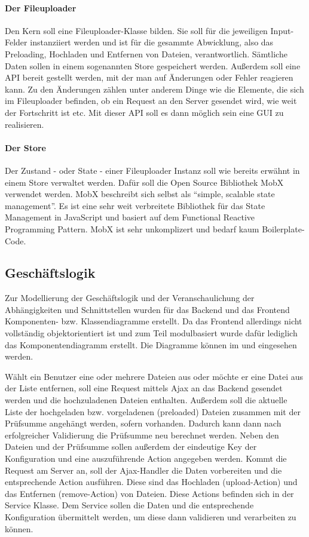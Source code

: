 \paragraph{Der Fileuploader} Den Kern soll eine Fileuploader-Klasse bilden. Sie soll für die jeweiligen Input-Felder instanziiert werden und ist für die gesammte Abwicklung, also das Preloading, Hochladen und Entfernen von Dateien, verantwortlich. Sämtliche Daten sollen in einem sogenannten Store gespeichert werden. Außerdem soll eine API bereit gestellt werden, mit der man auf Änderungen oder Fehler reagieren kann. Zu den Änderungen zählen unter anderem Dinge wie die Elemente, die sich im Fileuploader befinden, ob ein Request an den Server gesendet wird, wie weit der Fortschritt ist etc. Mit dieser API soll es dann möglich sein eine GUI zu realisieren. 

\paragraph{Der Store} Der Zustand - oder State - einer Fileuploader Instanz soll wie bereits erwähnt in einem Store verwaltet werden. Dafür soll die Open Source Bibliothek MobX verwendet werden. MobX beschreibt sich selbst als ``simple, scalable state management''. Es ist eine sehr weit verbreitete Bibliothek für das State Management in JavaScript und basiert auf dem Functional Reactive Programming Pattern. MobX ist sehr unkomplizert und bedarf kaum Boilerplate-Code.

\subsection{Geschäftslogik}
\label{sec:Geschaeftslogik} 

Zur Modellierung der Geschäftslogik und der Veranschaulichung der Abhängigkeiten und Schnittstellen  wurden für das Backend und das Frontend Komponenten- bzw. Klassendiagramme erstellt. Da das Frontend allerdings nicht vollständig objektorientiert ist und zum Teil modulbasiert wurde dafür lediglich das Komponentendiagramm erstellt. Die Diagramme können im  und  eingesehen werden. 

Wählt ein Benutzer eine oder mehrere Dateien aus oder möchte er eine Datei aus der Liste entfernen, soll eine Request mittels Ajax an das Backend gesendet werden und die hochzuladenen Dateien enthalten. Außerdem soll die aktuelle Liste der hochgeladen bzw. vorgeladenen (preloaded) Dateien zusammen mit der Prüfsumme angehängt werden, sofern vorhanden. Dadurch kann dann nach erfolgreicher Validierung die Prüfsumme neu berechnet werden. Neben den Dateien und der Prüfsumme sollen außerdem der eindeutige Key der Konfiguration und eine auszuführende Action angegeben werden. Kommt die Request am Server an, soll der Ajax-Handler die Daten vorbereiten und die entsprechende Action ausführen. Diese sind das Hochladen (upload-Action) und das Entfernen (remove-Action) von Dateien. Diese Actions befinden sich in der Service Klasse. Dem Service sollen die Daten und die entsprechende Konfiguration übermittelt werden, um diese dann validieren und verarbeiten zu können.

